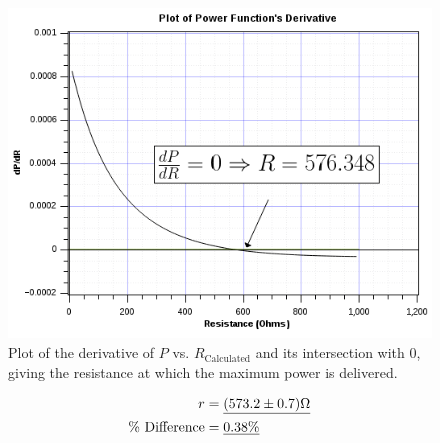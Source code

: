 \documentclass[twocolumn,english]{IEEEtran}
\theoremstyle{plain}
\theoremstyle{plain}
\begin{document}
  \begin{figure}[htpb]
  \begin{centering}
  \begin{center}
  \includegraphics[width=\linewidth]{./power_derivative.png}
  \caption{Plot of the derivative of $P$ vs. $R_{\text{Calculated}}$ and its intersection with 0, giving the resistance at which the maximum power is delivered.}
  \label{fig:power_derivative}
  \end{center}
  \par\end{centering}
  \end{figure}

  \begin{align*}
   r 				&= \text{\underline{$(573.2 \pm 0.7)\Omega$}}	\\
   \text{\% Difference} 	&= \text{\underline{0.38\%}}
  \end{align*}

  \noindent \hrulefill
\end{document}
